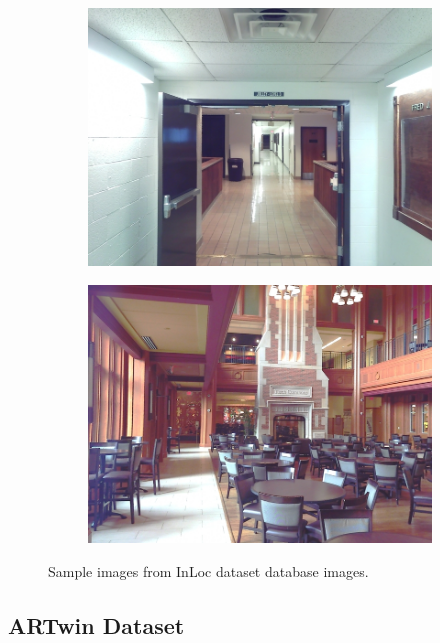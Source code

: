 \begin{figure}
    \centering
    \begin{subfigure}{.5\textwidth}
        \centering
        \includegraphics[width=.9\textwidth]{../graphics/cse_cutout_000_90_0.jpg}
    \end{subfigure}%
    \begin{subfigure}{.5\textwidth}
        \centering
        \includegraphics[width=.9\textwidth]{../graphics/DUC_cutout_003_0_0.jpg}
    \end{subfigure}
    \caption{Sample images from InLoc dataset database images.}\label{fig:inloc_dataset}
\end{figure}

\subsection{ARTwin Dataset}

